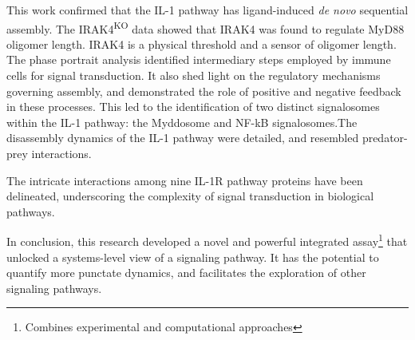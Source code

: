 This work confirmed that the IL-1 pathway has ligand-induced \emph{de novo} sequential assembly. The IRAK4\textsuperscript{KO} data showed that IRAK4 was found to regulate MyD88 oligomer length. IRAK4 is a physical threshold and a sensor of oligomer length. The phase portrait analysis identified intermediary steps employed by immune cells for signal transduction. It also shed light on the regulatory mechanisms governing assembly, and demonstrated the role of positive and negative feedback in these processes. This led to the identification of two distinct signalosomes within the IL-1 pathway: the Myddosome and NF-kB signalosomes.The disassembly dynamics of the IL-1 pathway were detailed, and resembled predator-prey interactions.

The intricate interactions among nine IL-1R pathway proteins have been delineated, underscoring the complexity of signal transduction in biological pathways.

In conclusion, this research developed a novel and powerful integrated assay\footnote{Combines experimental and computational approaches} that unlocked a systems-level view of a signaling pathway. It has the potential to quantify more punctate dynamics, and facilitates the exploration of other signaling pathways.

\sectionmark{}
\mygeometry
\pagestyle{fancy}
\renewcommand{\headrulewidth}{0pt} %

\fancyhead[RE]{} %

\fancyhead[LO]{} %
\fancyhead[RO]{{\footnotesize {}}\quad\thepage}


\fancypagestyle{plain}{
    \fancyhf{}
    \renewcommand{\headrulewidth}{0pt}
    \renewcommand{\footrulewidth}{0pt}
    \fancyfoot[RO]{\makebox[\paperwidth][r]{\hspace*{\oddsidemargin}\thepage\hspace{\dimexpr\marginparwidth+1.75\marginparsep-0.25in\relax}}}
}

\printbibliography

\mygeometry
\pagestyle{fancy}
\fancyhf{} %
\renewcommand{\headrulewidth}{0pt} %
\fancyhead[RE]{} %
\fancyhead[LO]{} %
\fancyhead[RO]{{\footnotesize {\rightmark}}\quad\thepage}
\RaggedRight

